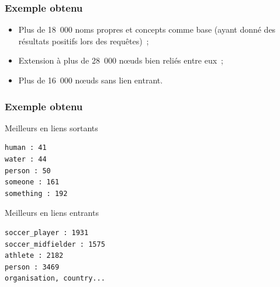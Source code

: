 \documentclass[12pt, handout]{beamer}
\begin{document}
\begin{frame}
  \frametitle{Exemple obtenu}
  
  \begin{itemize}
   \item Plus de 18~000 noms propres et concepts comme base (ayant donné des résultats positifs lors des requêtes)~;
   \item Extension à plus de 28~000 n\oe{}uds bien reliés entre eux~;
   \item Plus de 16~000 n\oe{}uds sans lien entrant.
  \end{itemize}

  
\end{frame}

\begin{frame}[fragile]
 \frametitle{Exemple obtenu}
 
 \begin{block}{Meilleurs en liens sortants}
  \begin{verbatim}
human : 41
water : 44
person : 50
someone : 161
something : 192 
  \end{verbatim}
 \end{block}

  \begin{block}{Meilleurs en liens entrants}
    \begin{verbatim}
soccer_player : 1931
soccer_midfielder : 1575
athlete : 2182
person : 3469
organisation, country...
    \end{verbatim}
  \end{block}
\end{frame}
\end{document}
